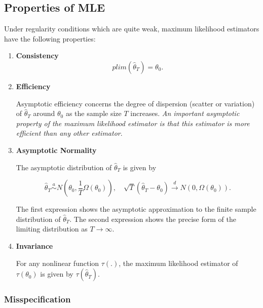 \documentclass[11pt]{article}
\begin{document}
\subsection{Properties of MLE}

\begin{shaded}
    Under regularity conditions which are quite weak, maximum likelihood estimators have the following properties:
    \begin{enumerate}
        \item \textbf{Consistency}
        \[plim(\hat{\theta}_T) = \theta_0.\]

        \item \textbf{Efficiency}

        Asymptotic efficiency concerns the degree of dispersion (scatter or variation) of $\hat{\theta}_T$ around $\theta_0$ as the sample size $T$ increases. \textit{An important asymptotic property of the maximum likelihood estimator is that this estimator is more efficient than any other estimator}.

        \item \textbf{Asymptotic Normality}

        The asymptotic distribution of $\hat{\theta}_T$ is given by

        \begin{equation}
            \widehat{\theta}_T \stackrel{a}{\sim} N\left(\theta_0, \frac{1}{T} \Omega\left(\theta_0\right)\right), \quad \sqrt{T}\left(\widehat{\theta}_T-\theta_0\right) \stackrel{d}{\longrightarrow} N\left(0, \Omega\left(\theta_0\right)\right) .
        \end{equation}

        \begin{note}
            The first expression shows the asymptotic approximation to the finite sample distribution of $\hat{\theta}_T$. The second expression shows the precise form of the limiting distribution as $T\rightarrow\infty$.
        \end{note}

        \item \textbf{Invariance}

        For any nonlinear function $\tau(.)$, the maximum likelihood estimator of $\tau(\theta_0)$ is given by $\tau(\hat{\theta}_T)$.
    \end{enumerate}
\end{shaded}

\subsubsection{Misspecification}
\end{document}
